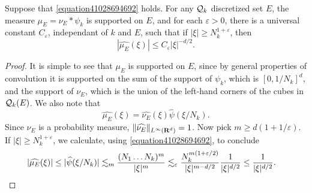 \begin{lemma} \label{lemma09679009341}
    Suppose that \eqref{equation41028694692} holds. For any $\operatorname{\mathcal{Q}}_k$ discretized set $E$, the measure $\mu_E = \nu_E * \psi_k$ is supported on $E$, and for each $\varepsilon > 0$, there is a universal constant $C_\varepsilon$, independant of $k$ and $E$, such that if $|\xi| \geq N_k^{1 + \varepsilon}$, then
    \[ |\widehat{\mu_E}(\xi)| \leq C_\varepsilon |\xi|^{-d/2}. \]
\end{lemma}
\begin{proof}
    It is simple to see that $\mu_E$ is supported on $E$, since by general properties of convolution it is supported on the sum of the support of $\psi_k$, which is $[0,1/N_k]^d$, and the support of $\nu_E$, which is the union of the left-hand corners of the cubes in $\operatorname{\mathcal{Q}}_k(E)$. We also note that
    \[ \widehat{\mu_E}(\xi) = \widehat{\nu_E}(\xi) \widehat{\psi}(\xi/N_k). \]
    Since $\nu_E$ is a probability measure, $\| \widehat{\nu_E} \|_{L^\infty(\operatorname{\mathbf{R}}^d)} = 1$. Now pick $m \geq d(1 + 1/\varepsilon)$. If $|\xi| \geq N_k^{1 + \varepsilon}$, we calculate, using \eqref{equation41028694692}, to conclude
    \begin{align*}
        |\widehat{\mu_E}(\xi)| &\leq |\widehat{\psi}(\xi/N_k)| \lesssim_m \frac{(N_1 \dots N_k)^m}{|\xi|^m} \lesssim_\varepsilon \frac{N_k^{m(1 + \varepsilon/2)}}{|\xi|^{m - d/2}} \frac{1}{|\xi|^{d/2}} \leq \frac{1}{|\xi|^{d/2}}. \qedhere
    \end{align*}
\end{proof}

